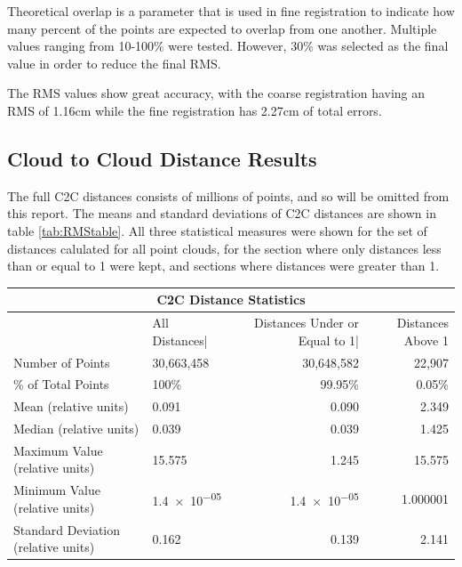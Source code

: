 \documentclass[man]{apa7}
\begin{document}
Theoretical overlap is a parameter that is used in fine registration to indicate how many percent of the points are expected to overlap from one another. Multiple values ranging from 10-100\% were tested. However, 30\% was selected as the final value in order to reduce the final RMS.

The RMS values show great accuracy, with the coarse registration having an RMS of 1.16cm while the fine registration has 2.27cm of total errors.


\subsection{Cloud to Cloud Distance Results}

The full C2C distances consists of millions of points, and so will be omitted from this report. The means and standard deviations of C2C distances are shown in table \ref{tab:RMStable}. All three statistical measures were shown for the set of distances calulated for all point clouds, for the section where only distances less than or equal to 1 were kept, and sections where distances were greater than 1.

\begin{minipage}{\linewidth}
  \small
  \setlength{\tabcolsep}{3pt} %
  \renewcommand{\arraystretch}{0.8} %
  \label{tab:RMStable}
  \begin{tabular}{@{}llrr@{}}         \toprule
  \multicolumn{4}{c}{C2C Distance Statistics }        \\ \toprule{}
  &  All Distances|    & Distances Under or Equal to 1| & Distances Above 1 \\ \midrule
  Number of Points & 30,663,458  & 30,648,582  & 22,907  \\
  \% of Total Points & 100\% & 99.95\% & 0.05\% \\
  Mean (relative units)      & 0.091 & 0.090 & 2.349  \\
  Median (relative units)    & 0.039 &  0.039  & 1.425   \\
  Maximum Value (relative units)       & 15.575  & 1.245  & 15.575   \\
  Minimum Value (relative units)       & \num{1.4e-05}  & \num{1.4e-05} & 1.000001  \\
  Standard Deviation (relative units)  & 0.162  & 0.139 & 2.141 \\ \bottomrule
  \end{tabular}
\end{minipage}
\end{document}
